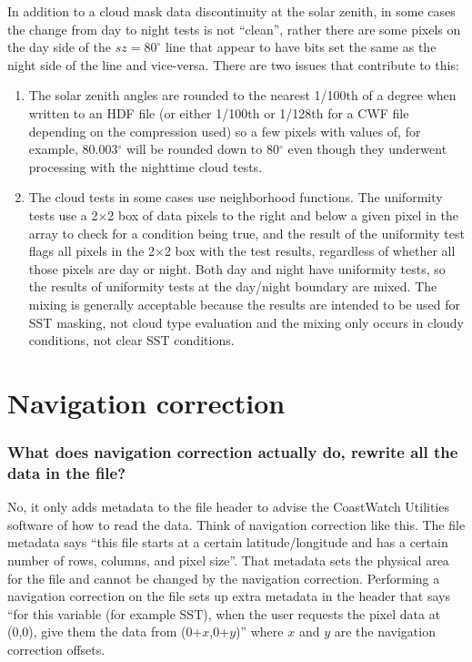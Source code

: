 In addition to a cloud mask data discontinuity at the solar zenith, in
some cases the change from day to night tests is not ``clean'', rather
there are some pixels on the day side of the $sz = 80^{\circ}$ line
that appear to have bits set the same as the night side of the line
and vice-versa.  There are two issues that contribute to this:
\begin{enumerate}

\item The solar zenith angles are rounded to the nearest 1/100th of a
degree when written to an HDF file (or either 1/100th or 1/128th for a
CWF file depending on the compression used) so a few pixels with
values of, for example, 80.003$^{\circ}$ will be rounded down to
80$^{\circ}$ even though they underwent processing with the nighttime
cloud tests.

\item The cloud tests in some cases use neighborhood functions.  The
uniformity tests use a 2$\times$2 box of data pixels to the right and
below a given pixel in the array to check for a condition being true,
and the result of the uniformity test flags all pixels in the
2$\times$2 box with the test results, regardless of whether all those
pixels are day or night.  Both day and night have uniformity tests, so
the results of uniformity tests at the day/night boundary are mixed.
The mixing is generally acceptable because the results are intended to
be used for SST masking, not cloud type evaluation and the mixing only
occurs in cloudy conditions, not clear SST conditions.

\end{enumerate}

\section{Navigation correction}

\subsubsection*{What does navigation correction actually do, rewrite all the data in the file?}

No, it only adds metadata to the file header to advise the CoastWatch
Utilities software of how to read the data.  Think of navigation
correction like this.  The file metadata says ``this file starts at a
certain latitude/longitude and has a certain number of rows, columns,
and pixel size''.  That metadata sets the physical area for the file
and cannot be changed by the navigation correction.  Performing a
navigation correction on the file sets up extra metadata in the header
that says ``for this variable (for example SST), when the user
requests the pixel data at (0,0), give them the data from
(0+$x$,0+$y$)'' where $x$ and $y$ are the navigation correction
offsets.

